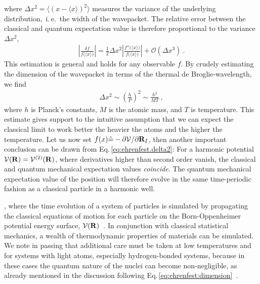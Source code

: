 where $\Delta x^2 = \bm{\langle} (x - \langle x \rangle)^2 \bm{\rangle}$ measures the variance of the underlying distribution,~i.\,e.~the width of the wavepacket. The relative error between the classical and quantum expectation value is %
therefore proportional to the variance $\Delta x^2$,
\begin{align}
\left\lvert \frac{\delta f}{f \bm ( \langle x \rangle \bm{)}} \right\rvert
= \frac{1}{2} \Delta x^2 \left\lvert \frac{f'' \bm ( \langle x \rangle \bm{)}}{f \bm ( \langle x \rangle \bm{)}} \right\rvert
+ \mathcal{O}(\Delta x^3)~.
\label{eq:ehrenfest.delta2}
\end{align}
This estimation is general and holds for any observable $f$.
By crudely estimating the dimension of the wavepacket in terms of the thermal de Broglie-wavelength, we find
\begin{align}
\Delta x^2 
\sim \left( \frac{h}{P} \right)^2
\sim \frac{h^2}{MT}~,
\label{eq:ehrenfest:dimension}
\end{align}
where $h$ is Planck's constants, $M$ is the atomic mass, and $T$ is temperature. This estimate gives support to the intuitive assumption that we can expect the classical limit to work better the heavier the atoms and the higher the temperature.
Let us now set $f(x) \hat = -\partial \mathcal V / \partial {\bf R}_I$, then another important conclusion can be drawn from Eq.\,\eqref{eq:ehrenfest.delta2}: For a harmonic potential $\mathcal V ({\bf R}) = \mathcal V^{(2)} ({\bf R})$, where derivatives higher than second order vanish, the classical and quantum mechanical expectation values \emph{coincide}. The quantum mechanical expectation value of the position will therefore evolve in the same time-periodic fashion as a classical particle in a harmonic well.

, where the time evolution of a system of particles is simulated by propagating the classical equations of motion for each particle on the Born-Oppenheimer potential energy surface, $\mathcal V ({\bf R})$~\cite{Parrinello1981,Car1985}. In conjunction with classical statistical mechanics, a wealth of thermodynamic properties of materials can be simulated.
We note in passing that
additional care must be taken at low temperatures and for systems with light atoms, especially hydrogen-bonded systems, because in these cases the quantum nature of the nuclei can become non-negligible, as already mentioned in the discussion following Eq.\,\eqref{eq:ehrenfest:dimension}~\cite{Parrinello1984,Markland2018,Litman2020}.

